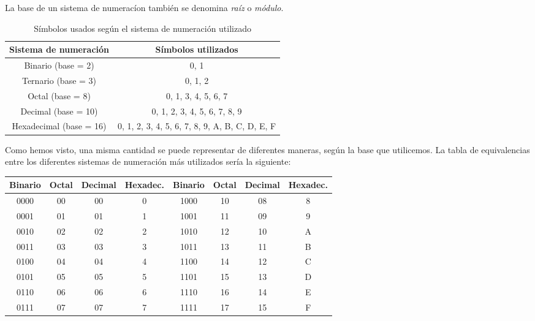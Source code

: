 \documentclass[12pt]{article}
\begin{document}
			La base de un sistema de numeracíon también se denomina \textit{raíz} o \textit{módulo}.\\
			
			\begin{table}[H]
				\centering
				\begin{tabular}{c|c}
					Sistema de numeración & Símbolos utilizados\\
					\midrule
					Binario (base = 2) & 0, 1\\
					Ternario (base = 3) & 0, 1, 2\\
					Octal (base = 8) & 0, 1, 3, 4, 5, 6, 7\\
					Decimal (base = 10) & 0, 1, 2, 3, 4, 5, 6, 7, 8, 9\\
					Hexadecimal (base = 16) & 0, 1, 2, 3, 4, 5, 6, 7, 8, 9, A, B, C, D, E, F\\
				\end{tabular}
				\caption{Símbolos usados según el sistema de numeración utilizado}
			\end{table}
			
			Como hemos visto, una misma cantidad se puede representar de diferentes maneras, según la base que utilicemos. La tabla de equivalencias entre los diferentes sistemas de numeración más utilizados sería la siguiente:\\
			
			\begin{table}[H]
				\centering
				\begin{tabular}{c|c|c|c||c|c|c|c}
					Binario & Octal & Decimal & Hexadec. & Binario & Octal & Decimal & Hexadec. \\
					\toprule
					0000 & 00 & 00 & 0 & 1000 & 10 & 08 & 8 \\
					0001 & 01 & 01 & 1 & 1001 & 11 & 09 & 9 \\
					0010 & 02 & 02 & 2 & 1010 & 12 & 10 & A \\
					0011 & 03 & 03 & 3 & 1011 & 13 & 11 & B \\
					0100 & 04 & 04 & 4 & 1100 & 14 & 12 & C \\
					0101 & 05 & 05 & 5 & 1101 & 15 & 13 & D \\
					0110 & 06 & 06 & 6 &1110 & 16 & 14 & E \\
					0111 & 07 & 07 & 7 & 1111 & 17 & 15 & F \\
					\bottomrule					
				\end{tabular}
			\end{table}
			
			\newpage
			      
\end{document}
